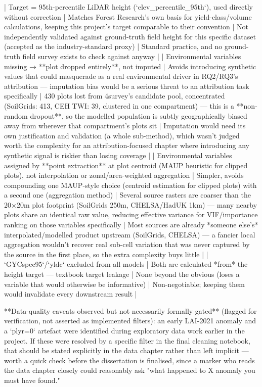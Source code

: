 | Target = 95th-percentile LiDAR height (`elev_percentile_95th`), used directly without correction | Matches Forest Research's own basis for yield-class/volume calculations, keeping this project's target comparable to their convention | Not independently validated against ground-truth field height for this specific dataset (accepted as the industry-standard proxy) | Standard practice, and no ground-truth field survey exists to check against anyway |
| Environmental variables missing → **plot dropped entirely**, not imputed | Avoids introducing synthetic values that could masquerade as a real environmental driver in RQ2/RQ3's attribution — imputation bias would be a serious threat to an attribution task specifically | 430 plots lost from 4survey's candidate pool, concentrated (SoilGrids: 413, CEH TWI: 39, clustered in one compartment) — this is a **non-random dropout**, so the modelled population is subtly geographically biased away from wherever that compartment's plots sit | Imputation would need its own justification and validation (a whole sub-method), which wasn't judged worth the complexity for an attribution-focused chapter where introducing any synthetic signal is riskier than losing coverage |
| Environmental variables assigned by **point extraction** at plot centroid (MAUP heuristic for clipped plots), not interpolation or zonal/area-weighted aggregation | Simpler, avoids compounding one MAUP-style choice (centroid estimation for clipped plots) with a second one (aggregation method) | Several source rasters are coarser than the 20×20m plot footprint (SoilGrids 250m, CHELSA/HadUK 1km) — many nearby plots share an identical raw value, reducing effective variance for VIF/importance ranking on those variables specifically | Most sources are already *someone else's* interpolated/modelled product upstream (SoilGrids, CHELSA) — a fancier local aggregation wouldn't recover real sub-cell variation that was never captured by the source in the first place, so the extra complexity buys little |
| `GYCspec95`/`yldc` excluded from all models | Both are calculated *from* the height target — textbook target leakage | None beyond the obvious (loses a variable that would otherwise be informative) | Non-negotiable; keeping them would invalidate every downstream result |

**Data-quality caveats observed but not necessarily formally gated** (flagged for verification, not asserted as implemented filters): an early LAI-2021 anomaly and a `plyr=0` artefact were identified during exploratory data work earlier in the project. If these were resolved by a specific filter in the final cleaning notebook, that should be stated explicitly in the data chapter rather than left implicit — worth a quick check before the dissertation is finalised, since a marker who reads the data chapter closely could reasonably ask "what happened to X anomaly you must have found."

